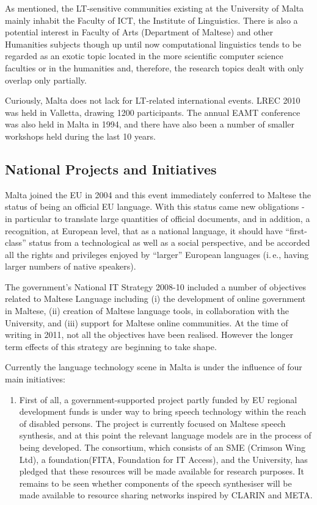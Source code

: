 \documentclass[]{../../metanetpaper}
\begin{document}
\begin{multicols}{2}
As mentioned, the LT-sensitive communities existing at the University of Malta mainly inhabit the Faculty of ICT, the Institute of Linguistics. There is also a potential interest in Faculty of Arts (Department of Maltese) and other Humanities subjects though up until now computational linguistics tends to be regarded as an exotic topic located in the more scientific computer science faculties or in the humanities and, therefore, the research topics dealt with only overlap only partially.

Curiously, Malta does not lack for LT-related international events. LREC 2010 was held in Valletta, drawing 1200 participants. The annual EAMT conference was also held in Malta in 1994, and there have also been a number of smaller workshops held during the last 10 years.

\subsection{National Projects and Initiatives}

Malta joined the EU in 2004 and this event immediately conferred to Maltese the status of being an official EU language. With this status came new obligations - in particular to translate large quantities of official documents, and in addition, a recognition, at European level, that as a national language, it should have ``first-class'' status from a technological as well as a social perspective, and be accorded all the rights and privileges enjoyed by ``larger'' European languages (i.\,e., having larger numbers of native speakers). 

The government’s National IT Strategy 2008-10 included a number of objectives related to Maltese Language including (i) the development of online government in Maltese, (ii) creation of Maltese language tools, in collaboration with the University, and (iii) support for Maltese online communities. At the time of writing in 2011, not all the objectives have been realised. However the longer term effects of this strategy are beginning to take shape. 

Currently the language technology scene in Malta is under the influence of four main initiatives:
\begin{enumerate}
\item First of all, a government-supported project partly funded by EU regional development funds is under way to bring speech technology within the reach of disabled persons. The project is currently focused on Maltese speech synthesis, and at this point the relevant language models are in the process of being developed. The consortium, which consists of an SME (Crimson Wing Ltd), a foundation(FITA, Foundation for IT Access), and the University, has pledged that these resources will be made available for research purposes. It remains to be seen whether components of the speech synthesiser will be made available to resource sharing networks inspired by CLARIN and META.


\end{enumerate}
\end{multicols}
\end{document}
